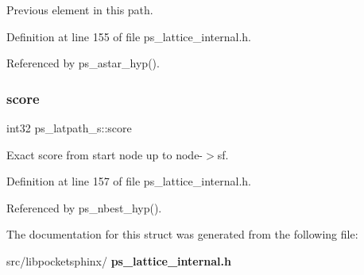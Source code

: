 Previous element in this path. 



Definition at line 155 of file ps\+\_\+lattice\+\_\+internal.\+h.



Referenced by ps\+\_\+astar\+\_\+hyp().

\mbox{\label{structps__latpath__s_a9249fb528f754db992df1d494a69b580}} 
\subsubsection{score}
{\footnotesize\ttfamily int32 ps\+\_\+latpath\+\_\+s\+::score}



Exact score from start node up to node-\/$>$sf. 



Definition at line 157 of file ps\+\_\+lattice\+\_\+internal.\+h.



Referenced by ps\+\_\+nbest\+\_\+hyp().



The documentation for this struct was generated from the following file\+:\begin{DoxyCompactItemize}
\item 
src/libpocketsphinx/\textbf{ ps\+\_\+lattice\+\_\+internal.\+h}\end{DoxyCompactItemize}

